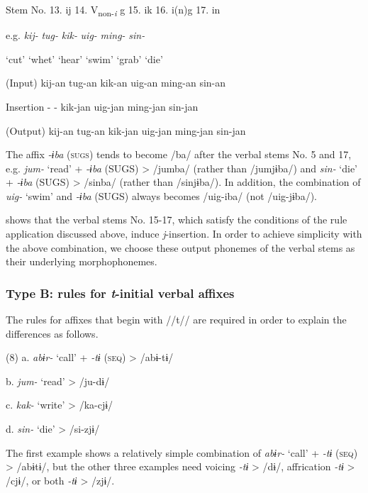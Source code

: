 Stem No.  13. ij  14. V\textsubscript{non-}\textit{\textsubscript{i}} g  15. ik  16. i(n)g    17. in

e.g.  \textit{kij-}  \textit{tug-}  \textit{kik-}  \textit{uig-}  \textit{ming-}  \textit{sin-}

  ‘cut’  ‘whet’  ‘hear’  ‘swim’  ‘grab’  ‘die’

(Input)  kij-an  tug-an  kik-an  uig-an  ming-an  sin-an

Insertion  {}-  {}-  kik-jan  uig-jan  ming-jan  sin-jan

(Output)  kij-an  tug-an  kik-jan  uig-jan  ming-jan  sin-jan

The affix \textit{{}-ɨba} (\textsc{sugs}) tends to become /ba/ after the verbal stems No. 5 and 17, e.g. \textit{jum-} ‘read’ + \textit{{}-ɨba} (SUGS) > /jumba/ (rather than /jumjɨba/) and \textit{sin-} ‘die’ + \textit{{}-ɨba} (SUGS) > /sinba/ (rather than /sinjɨba/). In addition, the combination of \textit{uig-} ‘swim’ and \textit{{}-ɨba} (SUGS) always becomes /uig-iba/ (not /uig-jɨba/).

 shows that the verbal stems No. 15-17, which satisfy the conditions of the rule application discussed above, induce \textit{j}{}-insertion. In order to achieve simplicity with the above combination, we choose these output phonemes of the verbal stems as their underlying morphophonemes.

\subsubsection{Type B: rules for \textit{t}{}-initial verbal affixes}
\label{bkm:Ref347175824}
The rules for affixes that begin with //t// are required in order to explain the differences as follows.

(8)  a.  \textit{abɨr-}  ‘call’  +  \textit{{}-tɨ} (\textsc{seq})  >  /abɨ-tɨ/

  b.  \textit{jum-}  ‘read’        >  /ju-dɨ/

  c.  \textit{kak-}  ‘write’        >  /ka-cjɨ/

  d.  \textit{sin-}  ‘die’        >  /si-zjɨ/

The first example shows a relatively simple combination of \textit{abɨr-} ‘call’ + \textit{{}-tɨ} (\textsc{seq}) > /abɨtɨ/, but the other three examples need voicing \textit{{}-tɨ} > /dɨ/, affrication \textit{{}-tɨ} > /cjɨ/, or both \textit{{}-tɨ} > /zjɨ/.

